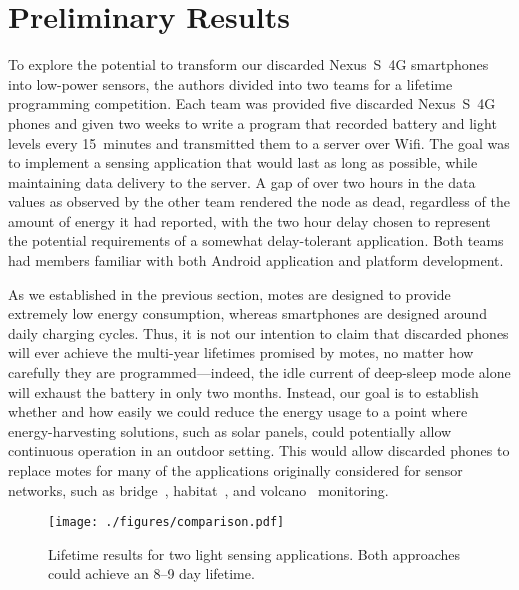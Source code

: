 \section{Preliminary Results}
\label{sec-results}

To explore the potential to transform our discarded Nexus~S~4G smartphones
into low-power sensors, the authors divided into two teams for a lifetime
programming competition. Each team was provided five discarded Nexus~S~4G
phones and given two weeks to write a program that recorded battery and light
levels every 15~minutes and transmitted them to a server over Wifi. The goal
was to implement a sensing application that would last as long as possible,
while maintaining data delivery to the server. A gap of over two hours in the
data values as observed by the other team rendered the node as dead,
regardless of the amount of energy it had reported, with the two hour delay
chosen to represent the potential requirements of a somewhat delay-tolerant
application. Both teams had members familiar with both Android application and
platform development.

As we established in the previous section, motes are designed to provide
extremely low energy consumption, whereas smartphones are designed around
daily charging cycles. Thus, it is not our intention to claim that discarded
phones will ever achieve the multi-year lifetimes promised by motes, no
matter how carefully they are programmed---indeed, the idle current of
deep-sleep mode alone will exhaust the battery in only two months. Instead,
our goal is to establish whether and how easily we could reduce the energy
usage to a point where energy-harvesting solutions, such as solar panels,
could potentially allow continuous operation in an outdoor setting. This
would allow discarded phones to replace motes for many of the applications
originally considered for sensor networks, such as
bridge~\cite{ggb-monitoring}, habitat~\cite{gdi}, and
volcano~\cite{lance-sensys08} monitoring.

\begin{figure}[t]
\texttt{[image: ./figures/comparison.pdf]}

\vspace*{-0.1in}

\caption{\small Lifetime results for two light sensing applications.
\textnormal{Both approaches could achieve an 8--9 day lifetime.}}

\vspace*{-0.1in}

\label{fig-comparison}
\end{figure}

